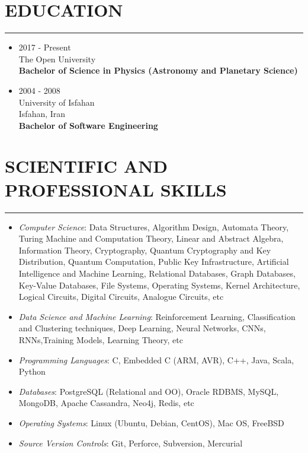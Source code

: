 \documentclass[10pt,a4paper]{article}
\begin{document}
\section{EDUCATION}
\noindent \rule {3.0cm}{0.4pt}
  \begin{itemize}
    \item \small {2017 - Present \\
                  The Open University \\
                  \textbf{Bachelor of Science in Physics (Astronomy and Planetary Science) }}
  \end{itemize}
  \begin{itemize}
    \item \small {2004 - 2008 \\
                  University of Isfahan \\
                  Isfahan, Iran \\
                  \textbf{Bachelor of Software Engineering}}
  \end{itemize}



\section{SCIENTIFIC AND PROFESSIONAL SKILLS}
\noindent \rule {10.0cm}{0.4pt}
\begin{itemize}
  \setlength{\rightskip}{2cm}
  \setlength\itemsep{0em}
  \item \small \textit {Computer Science}:
  Data Structures, Algorithm Design, Automata Theory, Turing Machine and Computation Theory, Linear and Abstract Algebra, Information Theory, Cryptography, Quantum Cryptography and Key Distribution, Quantum Computation, Public Key Infrastructure, Artificial Intelligence and Machine Learning,  Relational Databases, Graph Databases, Key-Value Databases, File Systems, Operating Systems, Kernel Architecture, Logical Circuits, Digital Circuits, Analogue Circuits, etc
  \item \small \textit{Data Science and Machine Learning}:
  Reinforcement Learning, Classification and Clustering techniques, Deep Learning, Neural Networks, CNNs, RNNs,Training Models, Learning Theory, etc
  \item \small \textit {Programming Languages}: C, Embedded C (ARM, AVR), C++, Java, Scala, Python
  \item \small \textit {Databases}: PostgreSQL (Relational and OO), Oracle RDBMS, MySQL, MongoDB, Apache Cassandra, Neo4j, Redis, etc
  \item \small \textit {Operating Systems}: Linux (Ubuntu, Debian, CentOS), Mac OS, FreeBSD
  \item \small \textit {Source Version Controls}: Git, Perforce, Subversion, Mercurial
\end{itemize}
\end{document}
